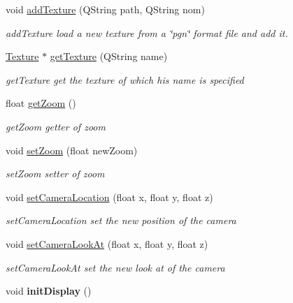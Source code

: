 \begin{DoxyCompactItemize}
\item 
void \hyperlink{classmodel__ground__GL_a82bf9c4ed0fbe81ae2c974adf61ea089}{add\-Texture} (Q\-String path, Q\-String nom)
\begin{DoxyCompactList}\small\item\em add\-Texture load a new texture from a \char`\"{}pgn\char`\"{} format file and add it. \end{DoxyCompactList}\item 
\hyperlink{classTexture}{Texture} $\ast$ \hyperlink{classmodel__ground__GL_aa3c0c273536f72146bebc19d033aaa1c}{get\-Texture} (Q\-String name)
\begin{DoxyCompactList}\small\item\em get\-Texture get the texture of which his name is specified \end{DoxyCompactList}\item 
float \hyperlink{classmodel__ground__GL_a183fe53d5167cd8fb1cb0c51985b87f1}{get\-Zoom} ()
\begin{DoxyCompactList}\small\item\em get\-Zoom getter of zoom \end{DoxyCompactList}\item 
void \hyperlink{classmodel__ground__GL_a2cb236c3269f3252615575da22003b07}{set\-Zoom} (float new\-Zoom)
\begin{DoxyCompactList}\small\item\em set\-Zoom setter of zoom \end{DoxyCompactList}\item 
void \hyperlink{classmodel__ground__GL_ae0b4256b36fa5d2c0fd14d5b97e5bac2}{set\-Camera\-Location} (float x, float y, float z)
\begin{DoxyCompactList}\small\item\em set\-Camera\-Location set the new position of the camera \end{DoxyCompactList}\item 
void \hyperlink{classmodel__ground__GL_a9cadcfbe6c58dfc69b41c9c95b46bffe}{set\-Camera\-Look\-At} (float x, float y, float z)
\begin{DoxyCompactList}\small\item\em set\-Camera\-Look\-At set the new look at of the camera \end{DoxyCompactList}\item 
\hypertarget{classmodel__ground__GL_ab27e1908aac2edaa67b7d780f4679cc0}{void {\bfseries init\-Display} ()}\label{classmodel__ground__GL_ab27e1908aac2edaa67b7d780f4679cc0}

\end{DoxyCompactItemize}
